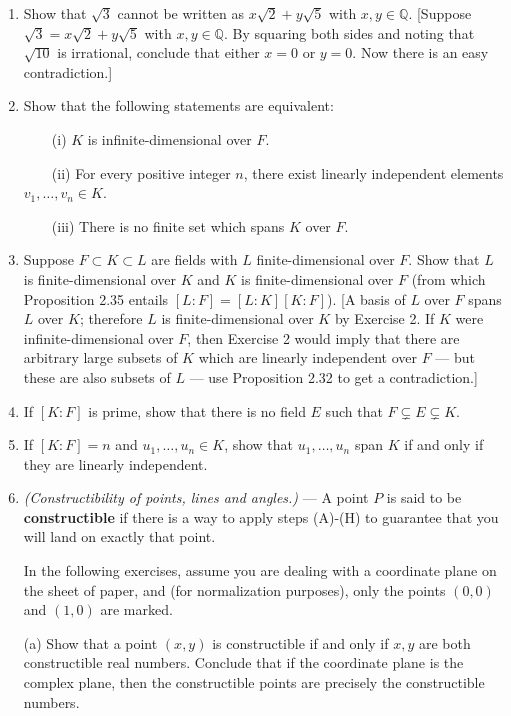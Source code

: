 \documentclass[leqno]{book}
\begin{document}
\begin{enumerate}
\item Show that $\sqrt 3$ cannot be written as $x\sqrt 2+y\sqrt 5$ with $x,y\in\mathbb Q$.  [Suppose $\sqrt 3=x\sqrt 2+y\sqrt 5$ with $x,y\in\mathbb Q$.  By squaring both sides and noting that $\sqrt{10}$ is irrational, conclude that either $x=0$ or $y=0$.  Now there is an easy contradiction.]

\item Show that the following statements are equivalent:

~~~~(i) $K$ is infinite-dimensional over $F$.

~~~~(ii) For every positive integer $n$, there exist linearly independent elements $v_1,\dots,v_n\in K$.

~~~~(iii) There is no finite set which spans $K$ over $F$.

\item Suppose $F\subset K\subset L$ are fields with $L$ finite-dimensional over $F$.  Show that $L$ is finite-dimensional over $K$ and $K$ is finite-dimensional over $F$ (from which Proposition 2.35 entails $[L:F]=[L:K][K:F]$).  [A basis of $L$ over $F$ spans $L$ over $K$; therefore $L$ is finite-dimensional over $K$ by Exercise 2.  If $K$ were infinite-dimensional over $F$, then Exercise 2 would imply that there are arbitrary large subsets of $K$ which are linearly independent over $F$ \---- but these are also subsets of $L$ \---- use Proposition 2.32 to get a contradiction.]

\item If $[K:F]$ is prime, show that there is no field $E$ such that $F\subsetneq E\subsetneq K$.

\item If $[K:F]=n$ and $u_1,\dots,u_n\in K$, show that $u_1,\dots,u_n$ span $K$ if and only if they are linearly independent.

\item\emph{(Constructibility of points, lines and angles.)} \---- A point $P$ is said to be \textbf{constructible} if there is a way to apply steps (A)-(H) to guarantee that you will land on exactly that point.

In the following exercises, assume you are dealing with a coordinate plane on the sheet of paper, and (for normalization purposes), only the points $(0,0)$ and $(1,0)$ are marked.

(a) Show that a point $(x,y)$ is constructible if and only if $x,y$ are both constructible real numbers.  Conclude that if the coordinate plane is the complex plane, then the constructible points are precisely the constructible numbers.


\end{enumerate}
\end{document}
